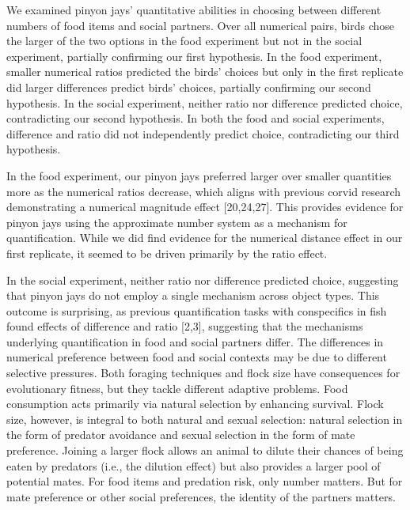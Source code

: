 \documentclass[
  ,doc,floatsintext]{apa6}
\begin{document}
We examined pinyon jays' quantitative abilities in choosing between different numbers of food items and social partners. Over all numerical pairs, birds chose the larger of the two options in the food experiment but not in the social experiment, partially confirming our first hypothesis. In the food experiment, smaller numerical ratios predicted the birds' choices but only in the first replicate did larger differences predict birds' choices, partially confirming our second hypothesis. In the social experiment, neither ratio nor difference predicted choice, contradicting our second hypothesis. In both the food and social experiments, difference and ratio did not independently predict choice, contradicting our third hypothesis.

In the food experiment, our pinyon jays preferred larger over smaller quantities more as the numerical ratios decrease, which aligns with previous corvid research demonstrating a numerical magnitude effect {[}20,24,27{]}. This provides evidence for pinyon jays using the approximate number system as a mechanism for quantification. While we did find evidence for the numerical distance effect in our first replicate, it seemed to be driven primarily by the ratio effect.

In the social experiment, neither ratio nor difference predicted choice, suggesting that pinyon jays do not employ a single mechanism across object types. This outcome is surprising, as previous quantification tasks with conspecifics in fish found effects of difference and ratio {[}2,3{]}, suggesting that the mechanisms underlying quantification in food and social partners differ. The differences in numerical preference between food and social contexts may be due to different selective pressures. Both foraging techniques and flock size have consequences for evolutionary fitness, but they tackle different adaptive problems. Food consumption acts primarily via natural selection by enhancing survival. Flock size, however, is integral to both natural and sexual selection: natural selection in the form of predator avoidance and sexual selection in the form of mate preference. Joining a larger flock allows an animal to dilute their chances of being eaten by predators (i.e., the dilution effect) but also provides a larger pool of potential mates. For food items and predation risk, only number matters. But for mate preference or other social preferences, the identity of the partners matters.
\end{document}
